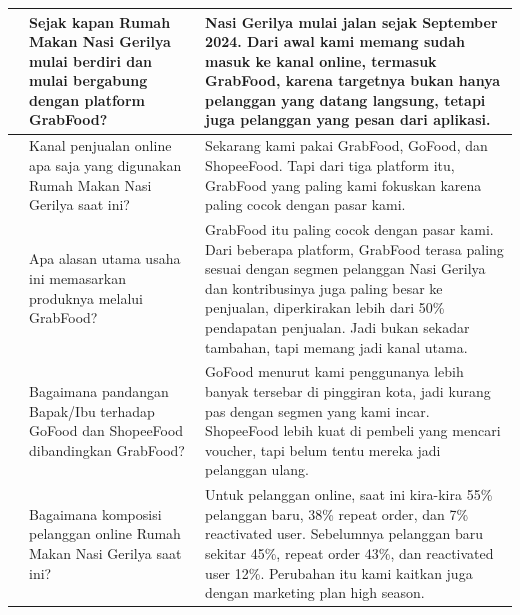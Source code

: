 {\begin{xltabular}{\textwidth}{|>{\centering\arraybackslash}p{0.7cm}|p{4.4cm}|Y|}
            \midrule
            \endhead
            \endfoot
            \bottomrule
                        & Sejak kapan Rumah Makan Nasi Gerilya mulai berdiri dan mulai bergabung dengan platform GrabFood?                               & Nasi Gerilya mulai jalan sejak September 2024. Dari awal kami memang sudah masuk ke kanal online, termasuk GrabFood, karena targetnya bukan hanya pelanggan yang datang langsung, tetapi juga pelanggan yang pesan dari aplikasi.                                                                                                             \\             & Kanal penjualan online apa saja yang digunakan Rumah Makan Nasi Gerilya saat ini?                                              & Sekarang kami pakai GrabFood, GoFood, dan ShopeeFood. Tapi dari tiga platform itu, GrabFood yang paling kami fokuskan karena paling cocok dengan pasar kami.                                                                                                                                                                                  \\             & Apa alasan utama usaha ini memasarkan produknya melalui GrabFood?                                                              & GrabFood itu paling cocok dengan pasar kami. Dari beberapa platform, GrabFood terasa paling sesuai dengan segmen pelanggan Nasi Gerilya dan kontribusinya juga paling besar ke penjualan, diperkirakan lebih dari 50\% pendapatan penjualan. Jadi bukan sekadar tambahan, tapi memang jadi kanal utama.                                       \\             & Bagaimana pandangan Bapak/Ibu terhadap GoFood dan ShopeeFood dibandingkan GrabFood?                                            & GoFood menurut kami penggunanya lebih banyak tersebar di pinggiran kota, jadi kurang pas dengan segmen yang kami incar. ShopeeFood lebih kuat di pembeli yang mencari voucher, tapi belum tentu mereka jadi pelanggan ulang.                                                                                                                  \\             & Bagaimana komposisi pelanggan online Rumah Makan Nasi Gerilya saat ini?                                                        & Untuk pelanggan online, saat ini kira-kira 55\% pelanggan baru, 38\% repeat order, dan 7\% reactivated user. Sebelumnya pelanggan baru sekitar 45\%, repeat order 43\%, dan reactivated user 12\%. Perubahan itu kami kaitkan juga dengan marketing plan high season.                                                                         \\ \hline

\end{xltabular}}
